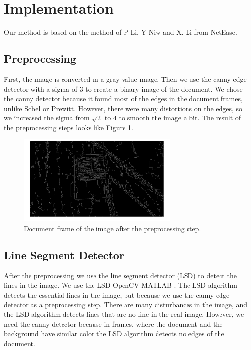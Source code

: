 \documentclass[english, paper=a4]{scrartcl}
\begin{document}
\section{Implementation}
Our method is based on the method of P Li, Y Niw and X. Li from NetEase.

\subsection{Preprocessing}
First, the image is converted in a gray value image. Then we use the canny edge detector with a sigma of 3 to create a binary image of the document. We chose the canny detector because it found most of the edges in the document frames, unlike Sobel or Prewitt. However, there were many distortions on the edges, so we increased the sigma from $\sqrt{2}$ to 4 to smooth the image a bit. The result of the preprocessing steps looks like Figure \ref{fig:pre}.

\begin{figure}[h]
\centering
\includegraphics[width=0.7\textwidth]{pre.png}
\caption{Document frame of the image after the preprocessing step.}
\label{fig:pre}
\end{figure}

\subsection{Line Segment Detector}
After the preprocessing we use the line segment detector (LSD) \cite{von2010lsd} to detect the lines in the image. We use the LSD-OpenCV-MATLAB \cite{lsd2014}. The LSD algorithm detects the essential lines in the image, but because we use the canny edge detector as a preprocessing step. There are many disturbances in the image, and the LSD algorithm detects lines that are no line in the real image. However, we need the canny detector because in frames, where the document and the background have similar color the LSD algorithm detects no edges of the document.
\end{document}
